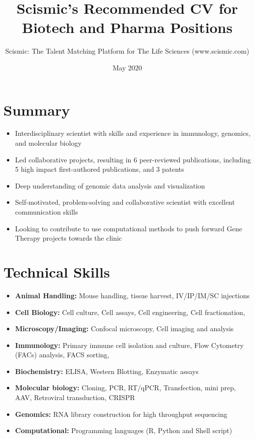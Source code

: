 \documentclass{article}
\title{Scismic's Recommended CV for Biotech and Pharma Positions}
\author{Scismic: The Talent Matching Platform for The Life Sciences (www.scismic.com)}
\date{May 2020}
\begin{document}

\makecvtitle %

\section{Summary}
\begin{itemize}
\item Interdisciplinary scientist with skills and experience in immunology, genomics, and molecular biology 
\item Led collaborative projects, resulting in 6 peer-reviewed publications, including 5 high impact first-authored publications, and 3 patents
\item Deep understanding of genomic data analysis and visualization 
\item Self-motivated, problem-solving and collaborative scientist with excellent communication skills
\item Looking to contribute to use computational methods to push forward Gene Therapy projects towards the clinic
\end{itemize}
 
\section{Technical Skills}

\begin{itemize}
\item \textbf{Animal Handling:} Mouse handling, tissue harvest, IV/IP/IM/SC injections
\item \textbf{Cell Biology:} Cell culture, Cell assays, Cell engineering, Cell fractionation, 
\item \textbf{Microscopy/Imaging:} Confocal microscopy, Cell imaging and analysis 
\item \textbf{Immunology:} Primary immune cell isolation and culture, Flow Cytometry (FACs) analysis, FACS sorting, 
\item \textbf{Biochemistry:} ELISA, Western Blotting, Enzymatic assays
\item \textbf{Molecular biology:} Cloning, PCR, RT/qPCR, Transfection, mini prep, AAV, Retroviral transduction, CRISPR 
\item \textbf{Genomics:} RNA library construction for high throughput sequencing 
\item \textbf{Computational:} Programming languages (R, Python and Shell script)
\end{itemize}
 
\end{document}
